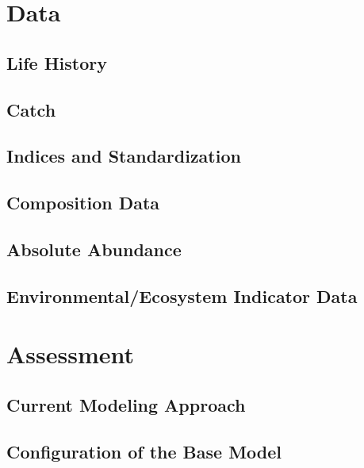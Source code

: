 \documentclass[
  letterpaper,
]{article}
\begin{document}
\newpage{}

\section{Data}\label{sec-data}

\subsection{Life History}\label{life-history}

\subsection{Catch}\label{catch}

\subsection{Indices and
Standardization}\label{indices-and-standardization}

\subsection{Composition Data}\label{composition-data}

\subsection{Absolute Abundance}\label{absolute-abundance}

\subsection{Environmental/Ecosystem Indicator
Data}\label{environmentalecosystem-indicator-data}

\newpage{}

\section{Assessment}\label{sec-assmt-config}

\subsection{Current Modeling Approach}\label{current-modeling-approach}

\subsection{Configuration of the Base
Model}\label{configuration-of-the-base-model}
\end{document}
